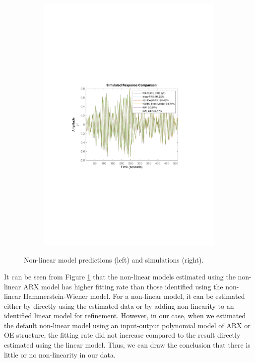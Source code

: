 \documentclass[]{article}
\begin{document}
\begin{figure}[ht]
\begin{subfigure}{.49\textwidth}
	\includegraphics[trim= 10cm 8cm 10cm 8cm, scale=0.4]{figures/simulations_nl.pdf}
\end{subfigure}
\caption{Non-linear model predictions (left) and simulations (right).}
\label{fig:nonlinear}
\end{figure}

It can be seen from Figure \ref{fig:nonlinear} that the non-linear models estimated using the non-linear ARX model has higher fitting rate than those identified using the non-linear Hammerstein-Wiener model. For a non-linear model, it can be estimated either by directly using the estimated data or by adding non-linearity to an identified linear model for refinement. However, in our case, when we estimated the default non-linear model using an input-output polynomial model of ARX or OE structure, the fitting rate did not increase compared to the result directly estimated using the linear model. Thus, we can draw the conclusion that there is little or no non-linearity in our data.
\end{document}
